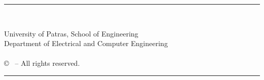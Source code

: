 \pagestyle{empty}

\vspace*{\fill}
\noindent \hspace{2cm} \rule{12.7cm}{0.4pt}\\
\vspace{-1.7em}
\begin{flushleft}
	\hspace*{30mm}University of Patras, School of Engineering\\
	\hspace*{30mm}Department of Electrical and Computer Engineering\\
	\hspace*{30mm}{\nomme}\\
	\hspace*{30mm}© \monthyear \ -- All rights reserved.\\
\end{flushleft}
\vspace{-1.2em}
\noindent \hspace{2cm} \rule{12.7cm}{0.4pt}
